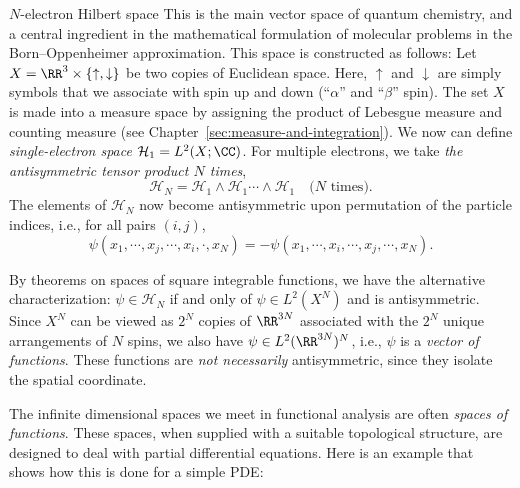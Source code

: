 \begin{myExample}{$N$-electron Hilbert space}{}
    This is the main vector space of quantum chemistry, and a central ingredient in the mathematical formulation of molecular problems in the Born--Oppenheimer approximation. This space is constructed as follows: Let $X = \RR^3 \times \{\uparrow, \downarrow\}$ be two copies of Euclidean space. Here, $\uparrow$ and $\downarrow$ are simply symbols that we associate with spin up and down (``$\alpha$'' and ``$\beta$'' spin). The set $X$ is made into a measure space by assigning the product of Lebesgue measure and counting measure (see Chapter~\ref{sec:measure-and-integration}). We now can define \emph{single-electron space} $\mathcal{H}_1 = L^2(X;\CC)$. For multiple electrons, we take \emph{the antisymmetric tensor product $N$ times},
    \begin{equation}
        \mathcal{H}_N = \mathcal{H}_1 \wedge \mathcal{H}_1 \cdots \wedge \mathcal{H}_1 \quad \text{($N$ times)}.
    \end{equation}
    The elements of $\mathcal{H}_N$ now become antisymmetric upon permutation of the particle indices, i.e., for all pairs $(i,j)$, 
    \[ \psi(x_1,\cdots, x_j, \cdots, x_i, \cdot ,x_N) = - \psi(x_1, \cdots, x_i, \cdots, x_j, \cdots, x_N). \]
    
    By theorems on spaces of square integrable functions, we have the alternative characterization: $\psi \in \mathcal{H}_N$ if and only of $\psi \in L^2(X^N)$ and is antisymmetric. Since $X^N$ can be viewed as $2^N$ copies of $\RR^{3N}$ associated with the $2^N$ unique arrangements of $N$ spins, we also have $\psi \in L^2(\RR^{3N})^N$, i.e., $\psi$ is a \emph{vector of functions}. These functions are \emph{not necessarily} antisymmetric, since they isolate the spatial coordinate.
\end{myExample}

The infinite dimensional spaces we meet in functional analysis are often \emph{spaces of functions}. These spaces, when supplied with a suitable topological structure, are designed to deal with partial differential equations. Here is an example that shows how this is done for a simple PDE:

